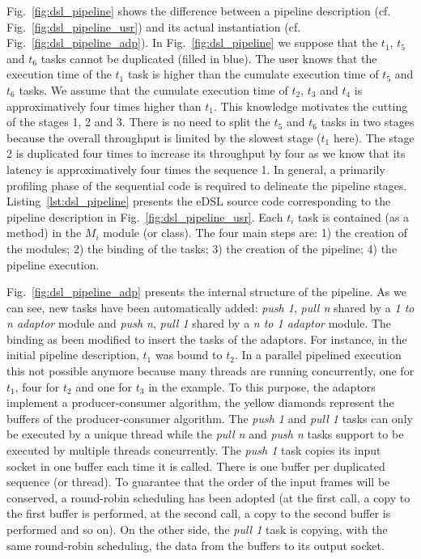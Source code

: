 Fig.~\ref{fig:dsl_pipeline} shows the difference between a pipeline description
(cf. Fig.~\ref{fig:dsl_pipeline_usr}) and its actual instantiation (cf.
Fig.~\ref{fig:dsl_pipeline_adp}). In Fig.~\ref{fig:dsl_pipeline} we suppose
that the $t_1$, $t_5$ and $t_6$ tasks cannot be duplicated (filled in blue). The
user knows that the execution time of the $t_1$ task is higher than the cumulate
execution time of $t_5$ and $t_6$ tasks. We assume that the cumulate execution
time of $t_2$, $t_3$ and $t_4$ is approximatively four times higher than $t_1$.
This knowledge motivates the cutting of the stages 1, 2 and 3. There is no need
to split the $t_5$ and $t_6$ tasks in two stages because the overall throughput
is limited by the slowest stage ($t_1$ here). The stage 2 is duplicated four
times to increase its throughput by four as we know that its latency is
approximatively four times the sequence 1. In general, a primarily profiling
phase of the sequential code is required to delineate the pipeline stages.
Listing~\ref{lst:dsl_pipeline} presents the \Cxx eDSL source code corresponding
to the pipeline description in Fig.~\ref{fig:dsl_pipeline_usr}. Each $t_i$ task
is contained (as a method) in the $M_i$ module (or class). The four main steps
are: 1) the creation of the modules; 2) the binding of the tasks; 3) the
creation of the pipeline; 4) the pipeline execution.

Fig.~\ref{fig:dsl_pipeline_adp} presents the internal structure of the pipeline.
As we can see, new tasks have been automatically added: \emph{push 1},
\emph{pull n} shared by a \emph{1 to n adaptor} module and \emph{push n},
\emph{pull 1} shared by a \emph{n to 1 adaptor} module. The binding as been
modified to insert the tasks of the adaptors. For instance, in the initial
pipeline description, $t_1$ was bound to $t_2$. In a parallel pipelined
execution this not possible anymore because many threads are running
concurrently, one for $t_1$, four for $t_2$ and one for $t_3$ in the example. To
this purpose, the adaptors implement a producer-consumer algorithm, the yellow
diamonds represent the buffers of the producer-consumer algorithm. The
\emph{push 1} and \emph{pull 1} tasks can only be executed by a unique thread
while the \emph{pull n} and \emph{push n} tasks support to be executed by
multiple threads concurrently. The \emph{push 1} task copies its input socket in
one buffer each time it is called. There is one buffer per duplicated sequence
(or thread). To guarantee that the order of the input frames will be conserved,
a round-robin scheduling has been adopted (at the first call, a copy to the
first buffer is performed, at the second call, a copy to the second buffer is
performed and so on). On the other side, the \emph{pull 1} task is copying, with
the same round-robin scheduling, the data from the buffers to its output socket.

